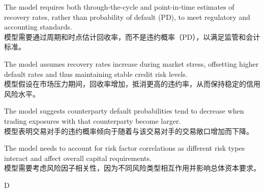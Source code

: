 \documentclass{article}
\begin{document}
            \begin{choices}
                \item The model requires both through-the-cycle and point-in-time estimates of recovery rates, rather than probability of default (PD), to meet regulatory and accounting standards. \\
                模型需要通过周期和时点估计回收率，而不是违约概率（PD），以满足监管和会计标准。
                
                \item The model assumes recovery rates increase during market stress, offsetting higher default rates and thus maintaining stable credit risk levels. \\
                模型假设在市场压力期间，回收率增加，抵消更高的违约率，从而保持稳定的信用风险水平。
                
                \item The model suggests counterparty default probabilities tend to decrease when trading exposures with that counterparty become larger. \\
                模型表明交易对手的违约概率倾向于随着与该交易对手的交易敞口增加而下降。
                
                \item The model needs to account for risk factor correlations as different risk types interact and affect overall capital requirements. \\
                模型需要考虑风险因子相关性，因为不同风险类型相互作用并影响总体资本要求。
            \end{choices}
            
            \begin{correctanswer}
            D
            \end{correctanswer}
            
\end{document}
